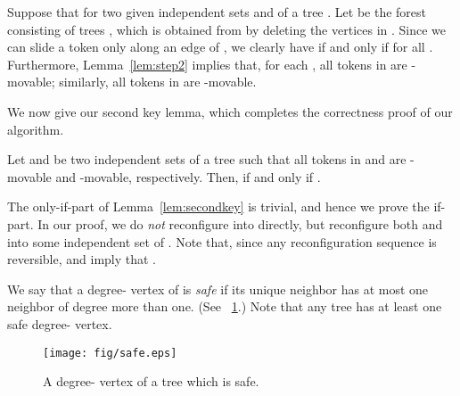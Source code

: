 \documentclass{llncs}
\newcounter{one}
\newcounter{two}
\begin{document}
	Suppose that  for two given independent sets  and  of a tree .
	Let  be the forest consisting of  trees , which is obtained from  by deleting the vertices in . 
	Since we can slide a token only along an edge of , we clearly have  if and only if  for all .
	Furthermore, Lemma~\ref{lem:step2} implies that, for each , all tokens in  are -movable;
similarly, all tokens in  are -movable. 
\medskip

	We now give our second key lemma, which completes the correctness proof of our algorithm. 
	\begin{lemma} \label{lem:secondkey}
	Let  and  be two independent sets of a tree  such that all tokens in  and  are -movable and -movable, respectively.
	Then,  if and only if . 
\end{lemma}
	
	The only-if-part of Lemma~\ref{lem:secondkey} is trivial, and hence we prove the if-part.
	In our proof, we do \emph{not} reconfigure  into  directly, but reconfigure both  and  into some independent set  of . 
Note that, since any reconfiguration sequence is reversible,  and  imply that .


	We say that a degree- vertex  of  is \emph{safe} if its unique neighbor  has at most one neighbor  of degree more than one.
(See \figurename~\ref{fig:safe}.) 
	Note that any tree has at least one safe degree- vertex. 
\begin{figure}[t]
\begin{center}
	\texttt{[image: fig/safe.eps]}
	\end{center}
	\vspace{-1em}
	\caption{A degree- vertex  of a tree  which is safe.}
	\label{fig:safe}
\end{figure}
\end{document}

